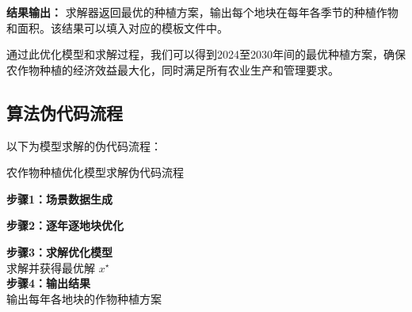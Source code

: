 \textbf{结果输出：}  
求解器返回最优的种植方案，输出每个地块在每年各季节的种植作物和面积。该结果可以填入对应的模板文件中。

通过此优化模型和求解过程，我们可以得到2024至2030年间的最优种植方案，确保农作物种植的经济效益最大化，同时满足所有农业生产和管理要求。

\subsection[\hspace{-2pt}算法伪代码流程]{{\heiti{} \hspace{-8pt}算法伪代码流程}}\label{section3: 算法伪代码流程}

以下为模型求解的伪代码流程：

\begin{algorithm}[H]\small
{} %
\renewcommand{\algorithmcfname}{算法}
\caption{农作物种植优化模型求解伪代码流程}

\textbf{步骤1：场景数据生成}\\

\textbf{步骤2：逐年逐地块优化}\\

\textbf{步骤3：求解优化模型}\\
求解并获得最优解 $x^\star$\\

\textbf{步骤4：输出结果}\\
输出每年各地块的作物种植方案\\

\label{algorithm:crop_optimization}
\end{algorithm}







